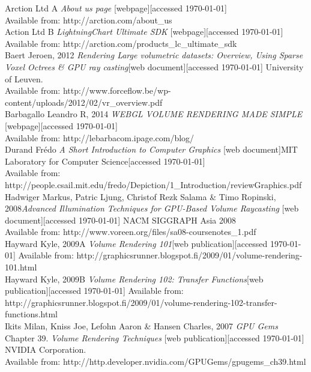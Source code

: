 \documentclass[twoside, english, 11pt]{report}
\begin{document}
\small Arction Ltd A \textit{About us page} [webpage][accessed \today] \\
Available from: http://arction.com/about\_us\\

\small Action Ltd B \textit{LightningChart Ultimate SDK} [webpage][accessed \today] \\
Available from: http://arction.com/products\_lc\_ultimate\_sdk\\

\small Baert Jeroen, 2012 \textit{Rendering Large volumetric datasets: Overview, Using Sparse Voxel Octrees \& GPU ray casting}[web document][accessed \today] University of Leuven.\\
Available from: http://www.forceflow.be/wp-content/uploads/2012/02/vr\_overview.pdf\\

\small Barbagallo Leandro R, 2014 \textit{WEBGL VOLUME RENDERING MADE SIMPLE} [webpage][accessed \today]\\ 
Available from: http://lebarbacom.ipage.com/blog/\\

\small Durand Frédo \textit{A Short Introduction to Computer Graphics} [web document]MIT Laboratory for Computer Science[accessed \today] \\
Available from: http://people.csail.mit.edu/fredo/Depiction/1\_Introduction/reviewGraphics.pdf\\

\small Hadwiger Markus, Patric Ljung, Christof Rezk Salama \& Timo Ropinski, 2008\textit{Advanced Illumination Techniques for GPU-Based Volume Raycasting} [web document][accessed \today] NACM SIGGRAPH Asia 2008 \\
Available from: http://www.voreen.org/files/sa08-coursenotes\_1.pdf\\

\small Hayward Kyle, 2009A \textit{Volume Rendering 101}[web publication][accessed \today]
Available from: http://graphicsrunner.blogspot.fi/2009/01/volume-rendering-101.html\\

\small Hayward Kyle, 2009B \textit{Volume Rendering 102: Transfer Functions}[web publication][accessed \today]
Available from: http://graphicsrunner.blogspot.fi/2009/01/volume-rendering-102-transfer-functions.html\\

\small Ikits Milan, Kniss Joe, Lefohn Aaron \& Hansen Charles, 2007 \textit{GPU Gems} Chapter 39. \textit{Volume Rendering Techniques} [web publication][accessed \today] NVIDIA Corporation.\\
Available from: http://http.developer.nvidia.com/GPUGems/gpugems\_ch39.html\\
\end{document}
